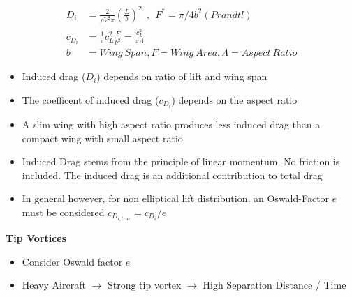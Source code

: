 \documentclass[9pt, landscape, fleqn]{scrartcl}
\begin{document}
\begin{multicols*}{3}
\begin{align*}
    D_i &= \frac{2}{\rho V^2 \pi}\left(\frac{L}{b}\right)^2~~,~~F^* = \pi/4 b^2 (Prandtl) \\
    c_{D_i} &= \frac{1}{\pi}c_L^2 \frac{F}{b^2} = \frac{c_L^2}{\pi \Lambda} \\
    b &= Wing~Span, F=Wing~Area, \Lambda = Aspect~Ratio
\end{align*}
\begin{itemize}
    \item Induced drag ($D_i$) depends on ratio of lift and wing span 
    \item The coefficent of induced drag ($c_{D_i}$) depends on the aspect ratio 
    \item A slim wing with high aspect ratio produces less induced drag than a compact wing with small aspect ratio
    \item Induced Drag stems from the principle of linear momentum. No friction is included. The induced drag is an additional contribution to total drag 
    \item In general however, for non elliptical lift distribution, an Oswald-Factor $e$ must be considered $c_{D_{i,true}} = c_{D_{i}} / e$ 
\end{itemize}
\underline{\textbf{Tip Vortices}}
\begin{itemize}
    \item Consider Oswald factor $e$
    \item Heavy Aircraft $\rightarrow$ Strong tip vortex $\rightarrow$ High Separation Distance / Time 
\end{itemize}


\end{multicols*}
\end{document}

